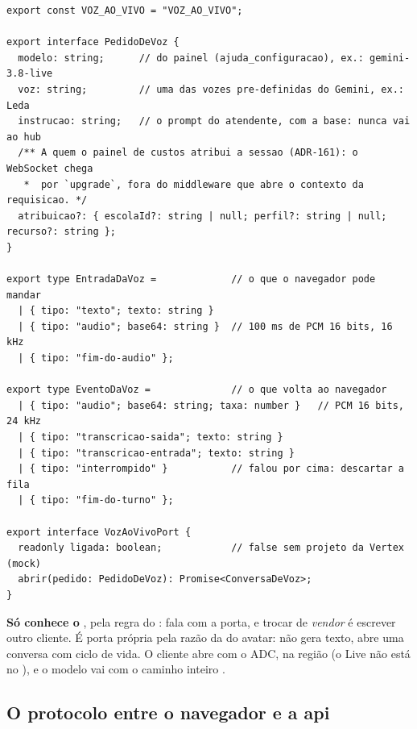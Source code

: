 \begin{lstlisting}[language=tsunoo, caption={\arq{apps/api/src/ai/voz-ao-vivo.port.ts} --- a quarta porta de \arq{src/ai} (abreviado)}, label={lst:vozport}]
export const VOZ_AO_VIVO = "VOZ_AO_VIVO";

export interface PedidoDeVoz {
  modelo: string;      // do painel (ajuda_configuracao), ex.: gemini-3.8-live
  voz: string;         // uma das vozes pre-definidas do Gemini, ex.: Leda
  instrucao: string;   // o prompt do atendente, com a base: nunca vai ao hub
  /** A quem o painel de custos atribui a sessao (ADR-161): o WebSocket chega
   *  por `upgrade`, fora do middleware que abre o contexto da requisicao. */
  atribuicao?: { escolaId?: string | null; perfil?: string | null; recurso?: string };
}

export type EntradaDaVoz =             // o que o navegador pode mandar
  | { tipo: "texto"; texto: string }
  | { tipo: "audio"; base64: string }  // 100 ms de PCM 16 bits, 16 kHz
  | { tipo: "fim-do-audio" };

export type EventoDaVoz =              // o que volta ao navegador
  | { tipo: "audio"; base64: string; taxa: number }   // PCM 16 bits, 24 kHz
  | { tipo: "transcricao-saida"; texto: string }
  | { tipo: "transcricao-entrada"; texto: string }
  | { tipo: "interrompido" }           // falou por cima: descartar a fila
  | { tipo: "fim-do-turno" };

export interface VozAoVivoPort {
  readonly ligada: boolean;            // false sem projeto da Vertex (mock)
  abrir(pedido: PedidoDeVoz): Promise<ConversaDeVoz>;
}
\end{lstlisting}

\begin{regra}
\textbf{Só  conhece o }, pela
regra do :  fala com a porta, e trocar de
\emph{vendor} é escrever outro cliente. É porta própria pela razão da do avatar:
não gera texto, abre uma conversa com ciclo de vida. O cliente abre
 com o ADC, na região
 (o Live não está no ), e o modelo vai com
o caminho inteiro .
\end{regra}

\subsection{O protocolo entre o navegador e a api}


